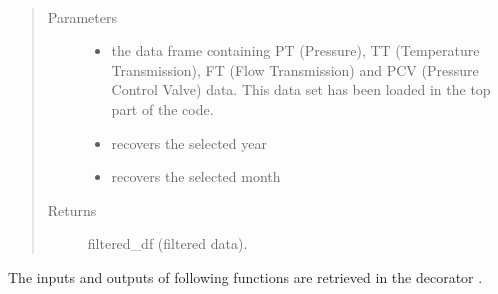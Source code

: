 \documentclass[letterpaper,10pt,english]{sphinxmanual}
\begin{document}
\begin{fulllineitems}
\label{\detokenize{app:filter_dataframe}}~\begin{quote}\begin{description}
\item[{Parameters}] \leavevmode\begin{itemize}
\item {} 
\sphinxAtStartPar
{} \textendash{} the data frame containing PT (Pressure), TT (Temperature Transmission), FT (Flow Transmission) and PCV                   (Pressure Control Valve) data.
This data set has been loaded in the top part of the code.

\item {} 
\sphinxAtStartPar
{} \textendash{} recovers the selected year

\item {} 
\sphinxAtStartPar
{} \textendash{} recovers the selected month

\end{itemize}

\item[{Returns}] \leavevmode
\sphinxAtStartPar
filtered\_df (filtered data).

\end{description}\end{quote}

\end{fulllineitems}


\sphinxAtStartPar
The inputs and outputs of following functions are retrieved in the decorator .
\end{document}
